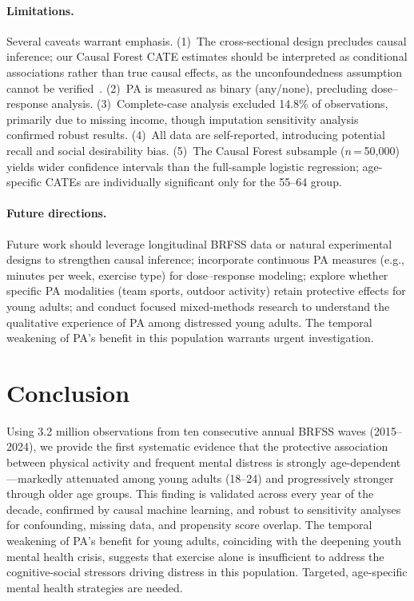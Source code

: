 \documentclass[11pt]{article}
\begin{document}
\paragraph{Limitations.}
Several caveats warrant emphasis.
(1)~The cross-sectional design precludes causal inference; our Causal Forest CATE estimates should be interpreted as conditional associations rather than true causal effects, as the unconfoundedness assumption cannot be verified~\citep{rosenbaum1983central}.
(2)~PA is measured as binary (any/none), precluding dose--response analysis.
(3)~Complete-case analysis excluded 14.8\% of observations, primarily due to missing income, though imputation sensitivity analysis confirmed robust results.
(4)~All data are self-reported, introducing potential recall and social desirability bias.
(5)~The Causal Forest subsample ($n$\,=\,50,000) yields wider confidence intervals than the full-sample logistic regression; age-specific CATEs are individually significant only for the 55--64 group.

\paragraph{Future directions.}
Future work should leverage longitudinal BRFSS data or natural experimental designs to strengthen causal inference; incorporate continuous PA measures (e.g., minutes per week, exercise type) for dose--response modeling; explore whether specific PA modalities (team sports, outdoor activity) retain protective effects for young adults; and conduct focused mixed-methods research to understand the qualitative experience of PA among distressed young adults.
The temporal weakening of PA's benefit in this population warrants urgent investigation.

\section{Conclusion}

Using 3.2 million observations from ten consecutive annual BRFSS waves (2015--2024), we provide the first systematic evidence that the protective association between physical activity and frequent mental distress is strongly age-dependent---markedly attenuated among young adults (18--24) and progressively stronger through older age groups.
This finding is validated across every year of the decade, confirmed by causal machine learning, and robust to sensitivity analyses for confounding, missing data, and propensity score overlap.
The temporal weakening of PA's benefit for young adults, coinciding with the deepening youth mental health crisis, suggests that exercise alone is insufficient to address the cognitive-social stressors driving distress in this population.
Targeted, age-specific mental health strategies are needed.
\end{document}
